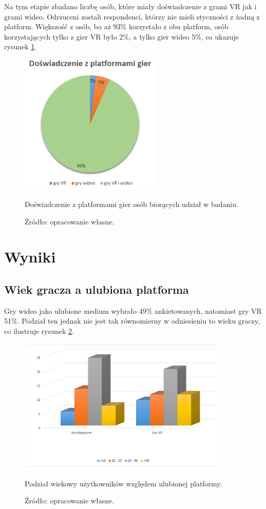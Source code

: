 Na tym etapie zbadano liczbę osób, które miały doświadczenie z grami VR jak i grami wideo. Odrzuceni zostali respondenci, którzy nie mieli styczności z żadną z platform. Większość z osób, bo aż 93\% korzystało z obu platform, osób korzystających tylko z gier VR było 2\%, a tylko gier wideo 5\%, co ukazuje rysunek \ref{figure:dplatformy}.

\begin{figure}[htb]
  \centering
  \includegraphics[width=0.6\textwidth]{images/dplatformy.PNG}
  \caption{Doświadczenie z platformami gier osób biorących udział w badaniu.}
  \caption*{Źródło: opracowanie własne.}
  \label{figure:dplatformy}
\end{figure}

\clearpage

\section{Wyniki}

\subsection{Wiek gracza a ulubiona platforma}

Gry wideo jako ulubione medium wybrało 49\% ankietowanych, natomiast gry VR 51\%. Podział ten jednak nie jest tak równomierny w odniesieniu to wieku graczy, co ilustruje rysunek \ref{figure:dwiek}.

\begin{figure}[htb]
  \centering
  \includegraphics[width=0.9\textwidth]{images/dwiek.PNG}
  \caption{Podział wiekowy użytkowników względem ulubionej platformy.}
  \caption*{Źródło: opracowanie własne.}
  \label{figure:dwiek}
\end{figure}


